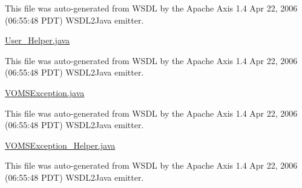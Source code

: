 This file was auto-\/generated from WSDL by the Apache Axis 1.4 Apr 22, 2006 (06:55:48 PDT) WSDL2Java emitter.

\hyperlink{User__Helper_8java}{User\_\-Helper.java}

This file was auto-\/generated from WSDL by the Apache Axis 1.4 Apr 22, 2006 (06:55:48 PDT) WSDL2Java emitter.

\hyperlink{VOMSException_8java}{VOMSException.java}

This file was auto-\/generated from WSDL by the Apache Axis 1.4 Apr 22, 2006 (06:55:48 PDT) WSDL2Java emitter.

\hyperlink{VOMSException__Helper_8java}{VOMSException\_\-Helper.java}

This file was auto-\/generated from WSDL by the Apache Axis 1.4 Apr 22, 2006 (06:55:48 PDT) WSDL2Java emitter. 